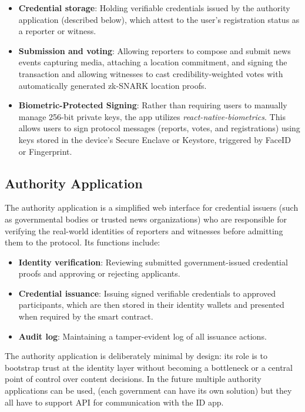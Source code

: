 \documentclass[11pt]{article}
\begin{document}
\begin{itemize}[noitemsep]
  \item \textbf{Credential storage}: Holding verifiable credentials issued by
    the authority application (described below), which attest to the user's
    registration status as a reporter or witness.
  \item \textbf{Submission and voting}: Allowing reporters to compose and submit
    news events capturing media, attaching a location commitment, and signing
    the transaction and allowing witnesses to cast credibility-weighted votes
    with automatically generated zk-SNARK location proofs.
    \item \textbf{Biometric-Protected Signing}: Rather than requiring users to manually manage 256-bit private keys, the app utilizes \textit{react-native-biometrics}. This allows users to sign protocol messages (reports, votes, and registrations) using keys stored in the device's Secure Enclave or Keystore, triggered by FaceID or Fingerprint.\textbf{}
\end{itemize}


\subsection{Authority Application}

The authority application is a simplified web interface for credential issuers
(such as governmental bodies or trusted news organizations) who are responsible
for verifying the real-world identities of reporters and witnesses before
admitting them to the protocol. Its functions include:

\begin{itemize}[noitemsep]
  \item \textbf{Identity verification}: Reviewing submitted government-issued
    credential proofs and approving or rejecting applicants.
  \item \textbf{Credential issuance}: Issuing signed verifiable credentials to
    approved participants, which are then stored in their identity wallets and
    presented when required by the smart contract.
  \item \textbf{Audit log}: Maintaining a tamper-evident log of all issuance
   actions.
\end{itemize}

The authority application is deliberately minimal by design: its role is to
bootstrap trust at the identity layer without becoming a bottleneck or a
central point of control over content decisions. In the future multiple authority applications can be used, (each government can have its own solution) but they all have to support API for communication with the ID app.
\end{document}

